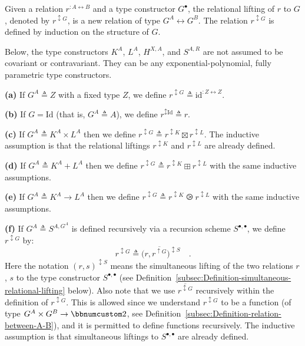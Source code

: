 Given a relation $r^{:A\leftrightarrow B}$ and a type constructor
$G^{\bullet}$, the relational lifting of $r$ to $G$, denoted by
$r^{\updownarrow G}$, is a new relation of type $G^{A}\leftrightarrow G^{B}$.
The relation $r^{\updownarrow G}$ is defined by induction on the
structure of $G$.

Below, the type constructors $K^{A}$, $L^{A}$, $H^{X,A}$, and $S^{A,R}$
are not assumed to be covariant or contravariant. They can be any
exponential-polynomial, fully parametric type constructors.

\textbf{(a)} If $G^{A}\triangleq Z$ with a fixed type $Z$, we define
$r^{\updownarrow G}\triangleq\text{id}^{:Z\leftrightarrow Z}$.

\textbf{(b)} If $G=\text{Id}$ (that is, $G^{A}\triangleq A$), we
define $r^{\updownarrow\text{Id}}\triangleq r$. 

\textbf{(c)} If $G^{A}\triangleq K^{A}\times L^{A}$ then we define
$r^{\updownarrow G}\triangleq r^{\updownarrow K}\boxtimes r^{\updownarrow L}$.
The inductive assumption is that the relational liftings $r^{\updownarrow K}$
and $r^{\updownarrow L}$ are already defined.

\textbf{(d)} If $G^{A}\triangleq K^{A}+L^{A}$ then we define $r^{\updownarrow G}\triangleq r^{\updownarrow K}\boxplus r^{\updownarrow L}$
with the same inductive assumptions.

\textbf{(e)} If $G^{A}\triangleq K^{A}\rightarrow L^{A}$ then we
define $r^{\updownarrow G}\triangleq r^{\updownarrow K}\ogreaterthan r^{\updownarrow L}$
with the same inductive assumptions.

\textbf{(f)} If $G^{A}\triangleq S^{A,G^{A}}$ is defined recursively
via a recursion scheme $S^{\bullet,\bullet}$, we define $r^{\updownarrow G}$
by:
\[
r^{\updownarrow G}\triangleq\big(r,\overline{r^{\uparrow G}}\big)^{\updownarrow S}\quad.
\]
Here the notation $(r,s)^{\updownarrow S}$ means the simultaneous
lifting of the two relations $r$, $s$ to the type constructor $S^{\bullet,\bullet}$
(see Definition~\ref{subsec:Definition-simultaneous-relational-lifting}
below). Also note that we use $\overline{r^{\updownarrow G}}$ recursively
within the definition of $r^{\updownarrow G}$. This is allowed since
we understand $r^{\updownarrow G}$ to be a function (of type $G^{A}\times G^{B}\rightarrow\bbnum 2$,
see Definition~\ref{subsec:Definition-relation-between-A-B}), and
it is permitted to define functions recursively. The inductive assumption
is that simultaneous liftings to $S^{\bullet,\bullet}$ are already
defined.

